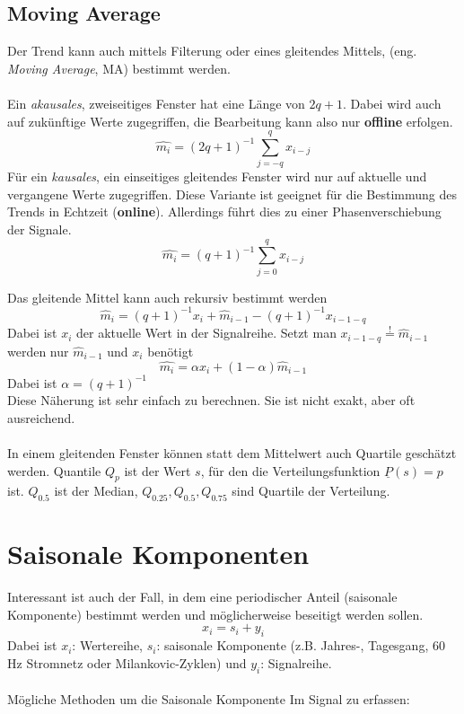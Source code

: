 \subsection{Moving Average}
Der Trend kann auch mittels Filterung oder eines gleitendes Mittels, (eng. \textsl{Moving Average}, MA) bestimmt werden.\\\\
Ein \textit{akausales}, zweiseitiges Fenster hat eine Länge von $2q + 1$. Dabei wird auch auf zukünftige Werte zugegriffen, die Bearbeitung kann also nur \textbf{offline} erfolgen.
\begin{equation}
\hat{m_i}=(2q+1)^{-1}\sum\limits_{j=-q}^q x_{i-j}
\end{equation}
Für ein \textit{kausales}, ein einseitiges gleitendes Fenster wird nur auf aktuelle und vergangene Werte zugegriffen. Diese Variante ist geeignet für die Bestimmung des Trends in Echtzeit (\textbf{online}). Allerdings führt dies zu einer Phasenverschiebung der Signale.
\begin{equation}
\hat{m_i}=(q+1)^{-1}\sum\limits_{j=0}^q x_{i-j}
\end{equation}

Das gleitende Mittel kann auch rekursiv bestimmt werden
\begin{equation}
\hat m_i=(q+1)^{-1} x_i +  \hat m_{i-1}-(q+1)^{-1} x_{i-1-q}
\end{equation}
Dabei ist $x_i$ der aktuelle Wert in der Signalreihe. Setzt man $x_{i-1-q}\stackrel{!}{=}\hat m_{i-1}$ werden nur $\hat m_{i-1}$ und $x_i$ benötigt
\begin{equation}
\hat{m_i}= \alpha x_i + (1-\alpha) \hat m_{i-1}
\end{equation}
Dabei ist $\alpha = (q+1)^{-1}$\\
Diese Näherung ist sehr einfach zu berechnen. Sie ist nicht exakt, aber oft ausreichend.\\\\
In einem gleitenden Fenster können statt dem Mittelwert auch Quartile geschätzt werden. Quantile $Q_p$ ist der Wert $s$, für den die Verteilungsfunktion $\underline P(s)=p$ ist. $Q_{0.5}$ ist der Median, $Q_{0.25},Q_{0.5},Q_{0.75}$ sind Quartile der Verteilung.

\section{Saisonale Komponenten}
Interessant ist auch der Fall, in dem eine periodischer Anteil (saisonale Komponente) bestimmt werden und möglicherweise beseitigt werden sollen.
\[
x_i=s_i + y_i
\]
Dabei ist $x_i$: Wertereihe, $s_i$: saisonale Komponente (z.B. Jahres-, Tagesgang, 60 Hz Stromnetz oder Milankovic-Zyklen) und $y_i$: Signalreihe.\\\\
Mögliche Methoden um die Saisonale Komponente Im Signal zu erfassen:

